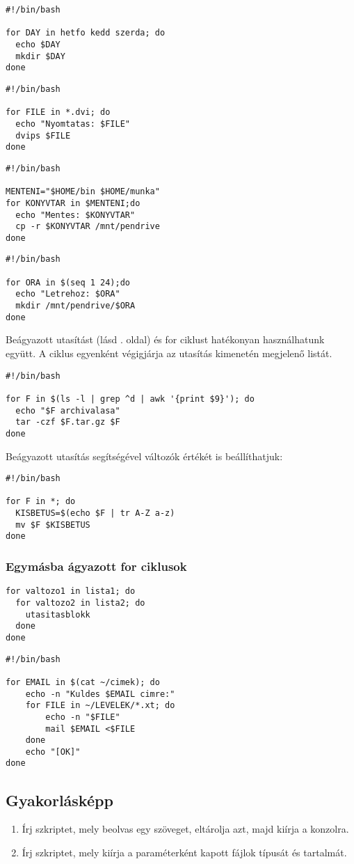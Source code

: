 \begin{lstlisting}
#!/bin/bash

for DAY in hetfo kedd szerda; do
  echo $DAY
  mkdir $DAY
done
\end{lstlisting}
\begin{lstlisting}
#!/bin/bash

for FILE in *.dvi; do
  echo "Nyomtatas: $FILE"
  dvips $FILE
done
\end{lstlisting}

\begin{lstlisting}
#!/bin/bash

MENTENI="$HOME/bin $HOME/munka"
for KONYVTAR in $MENTENI;do
  echo "Mentes: $KONYVTAR"
  cp -r $KONYVTAR /mnt/pendrive
done
\end{lstlisting}

\begin{lstlisting}
#!/bin/bash

for ORA in $(seq 1 24);do
  echo "Letrehoz: $ORA"
  mkdir /mnt/pendrive/$ORA
done
\end{lstlisting}

Beágyazott utasítást (lásd \pageref{beagyazott}. oldal) és for ciklust hatékonyan használhatunk együtt. 
A ciklus egyenként végigjárja az utasítás kimenetén megjelenő listát.
\begin{lstlisting}
#!/bin/bash

for F in $(ls -l | grep ^d | awk '{print $9}'); do
  echo "$F archivalasa"
  tar -czf $F.tar.gz $F
done
\end{lstlisting}

Beágyazott utasítás segítségével változók értékét is beállíthatjuk:
\begin{lstlisting}
#!/bin/bash

for F in *; do
  KISBETUS=$(echo $F | tr A-Z a-z)
  mv $F $KISBETUS
done
\end{lstlisting}

\subsubsection*{Egymásba ágyazott for ciklusok}
\begin{lstlisting}
for valtozo1 in lista1; do
  for valtozo2 in lista2; do
    utasitasblokk
  done
done
\end{lstlisting}\bigskip

\begin{lstlisting}
#!/bin/bash

for EMAIL in $(cat ~/cimek); do
    echo -n "Kuldes $EMAIL cimre:"
    for FILE in ~/LEVELEK/*.xt; do
        echo -n "$FILE"
        mail $EMAIL <$FILE
    done
    echo "[OK]"
done
\end{lstlisting}




\subsection*{Gyakorlásképp}
\begin{enumerate}
\item Írj szkriptet, mely beolvas egy szöveget, eltárolja azt, majd kiírja a konzolra.
\item Írj szkriptet, mely kiírja a paraméterként kapott fájlok típusát és tartalmát.
\end{enumerate}




